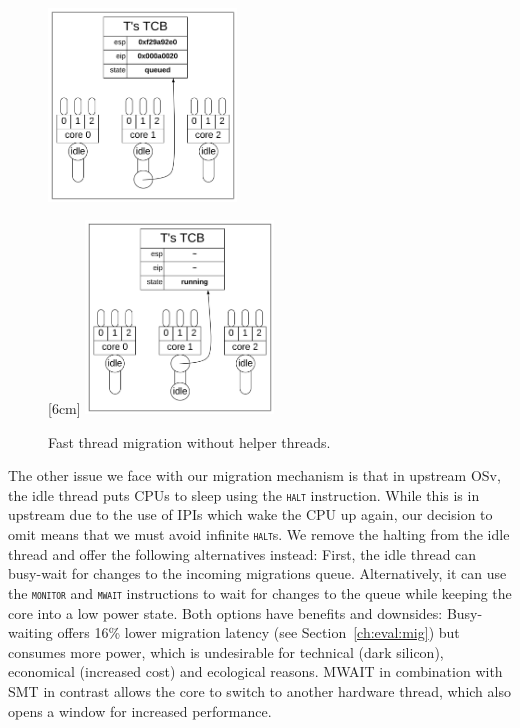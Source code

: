 \documentclass[12pt,a4paper]{book}
\begin{document}
\begin{figure}
{    \includegraphics[width=5cm]{fig_build/mig3}
    }
    \hfill
    \par
    \bigskip
    [6cm]{
    \includegraphics[width=5cm]{fig_build/mig4}
    }
    \caption{Fast thread migration without helper threads.}
    \label{fig:di:mig}
\end{figure}

The other issue we face with our migration mechanism is that in upstream OSv, the idle thread puts CPUs to sleep using the \textsc{\texttt{halt}} instruction.
While this is in upstream due to the use of IPIs which wake the CPU up again, our decision to omit means that we must avoid infinite \textsc{\texttt{halt}}s.
We remove the halting from the idle thread and offer the following alternatives instead:
First, the idle thread can busy-wait for changes to the incoming migrations queue.
Alternatively, it can use the \textsc{\texttt{monitor}} and \textsc{\texttt{mwait}} instructions to wait for changes to the queue while keeping the core into a low power state.
Both options have benefits and downsides:
Busy-waiting offers 16\% lower migration latency (see Section~\ref{ch:eval:mig}) but consumes more power, which is undesirable for technical (dark silicon), economical (increased cost) and ecological reasons.
MWAIT in combination with SMT in contrast allows the core to switch to another hardware thread, which also opens a window for increased performance.~\cite{intelSDMMWAIT,darkSilicon}
\end{document}

